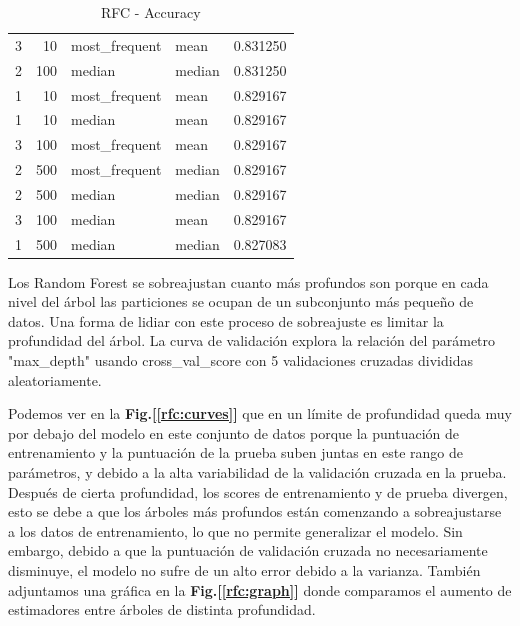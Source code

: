 \documentclass[12pt,twoside]{report}
\begin{document}
\begin{table}[ht!]
\begin{center}
{\begin{tabular}{rrllr}
              3 &                 10 &                   most\_frequent &                            mean &  0.831250 \\
              2 &                100 &                          median &                          median &  0.831250 \\
              1 &                 10 &                   most\_frequent &                            mean &  0.829167 \\
              1 &                 10 &                          median &                            mean &  0.829167 \\
              3 &                100 &                   most\_frequent &                            mean &  0.829167 \\
              2 &                500 &                   most\_frequent &                          median &  0.829167 \\
              2 &                500 &                          median &                          median &  0.829167 \\
              3 &                100 &                          median &                            mean &  0.829167 \\
              1 &                500 &                          median &                          median &  0.827083 \\
\bottomrule
\end{tabular}
}
\end{center}
\caption{RFC - Accuracy}
\label{rfc:table}
\end{table}

Los Random Forest se sobreajustan cuanto más profundos son porque en cada nivel del árbol las particiones se ocupan de un subconjunto más pequeño de datos. Una forma de lidiar con este proceso de sobreajuste es limitar la profundidad del árbol. La curva de validación explora la relación del parámetro "max\_depth" usando cross\_val\_score con 5 validaciones cruzadas divididas aleatoriamente. 


Podemos ver en la \textbf{Fig.[\ref{rfc:curves}]} que en un límite de profundidad queda muy por debajo del modelo en este conjunto de datos porque la puntuación de entrenamiento y la puntuación de la prueba suben juntas en este rango de parámetros, y debido a la alta variabilidad de la validación cruzada en la prueba. Después de cierta profundidad, los scores de entrenamiento y de prueba divergen, esto se debe a que los árboles más profundos están comenzando a sobreajustarse a los datos de entrenamiento, lo que no permite generalizar el modelo. Sin embargo, debido a que la puntuación de validación cruzada no necesariamente disminuye, el modelo no sufre de un alto error debido a la varianza. También adjuntamos una gráfica en la \textbf{Fig.[\ref{rfc:graph}]} donde comparamos el aumento de estimadores entre árboles de distinta profundidad.
\end{document}
